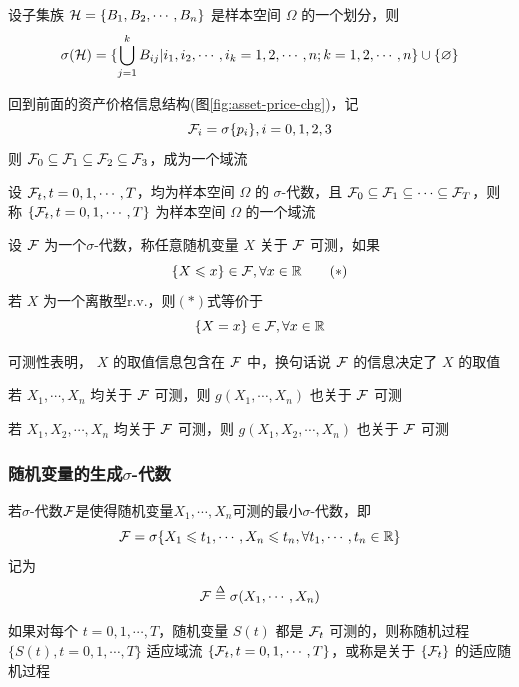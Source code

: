 \begin{example}
    设子集族 $\mathcal{H}=\{B_1,B_2,\cdots,B_n\}$ 是样本空间 $\Omega$ 的一个划分，则
    \[
    \sigma(\mathcal{H})=\{\bigcup_{j=1}^k B_{ij}|i_1,i_2,\cdots,i_k=1,2,\cdots,n;k=1,2,\cdots,n\}\cup \{\varnothing\}
    \]
\end{example}

回到前面的资产价格信息结构(图\ref{fig:asset-price-chg})，记
\[
\mathcal{F}_i=\sigma\{p_i\},i=0,1,2,3
\]
则 $\mathcal{F}_0\subseteq \mathcal{F}_1\subseteq \mathcal{F}_2\subseteq \mathcal{F}_3$，成为一个域流

\begin{definition}[域流]
    设 $\mathcal{F}_t,t=0,1,\cdots,T$，均为样本空间 $\Omega$ 的 $\sigma$-代数，且 $\mathcal{F}_0\subseteq \mathcal{F}_1\subseteq \cdots\subseteq \mathcal{F}_T$，则称 $\{\mathcal{F}_t,t=0,1,\cdots,T\}$ 为样本空间 $\Omega$ 的一个域流
\end{definition}

\begin{definition}[可测性]
    设 $\mathcal{F}$ 为一个$\sigma$-代数，称任意随机变量 $X$ 关于 $\mathcal{F}$ 可测，如果
    \[
    \{X\leqslant x\}\in \mathcal{F},\forall x\in \mathbb{R}\tag{$*$}
    \]
    若 $X$ 为一个离散型r.v.，则$(*)$式等价于
    \[
        \{X= x\}\in \mathcal{F},\forall x\in \mathbb{R}
    \]
\end{definition}

可测性表明， $X$ 的取值信息包含在 $\mathcal{F}$ 中，换句话说 $\mathcal{F}$ 的信息决定了 $X$ 的取值

\begin{property}
若 $X_1,\cdots,X_n$ 均关于 $\mathcal{F}$ 可测，则 $g(X_1,\cdots,X_n)$ 也关于 $\mathcal{F}$ 可测
\end{property}

\begin{property}
    若 $X_1,X_2,\cdots,X_n$ 均关于 $\mathcal{F}$ 可测，则 $g(X_1,X_2,\cdots,X_n)$ 也关于 $\mathcal{F}$ 可测
\end{property}

\subsubsection{随机变量的生成$\sigma$-代数}

若$\sigma$-代数$\mathcal{F}$是使得随机变量$X_1,\cdots,X_n$可测的最小$\sigma$-代数，即
\[
\mathcal{F}=\sigma\{X_1\leqslant t_1,\cdots ,X_n\leqslant t_n,\forall t_1,\cdots,t_n\in \mathbb{R}\}
\]
记为
\[
\mathcal{F}\overset{\Delta}{=}\sigma(X_1,\cdots,X_n)
\]

\begin{definition}[适应域流]
    如果对每个 $t=0,1,\cdots,T$，随机变量 $S(t)$ 都是 $\mathcal{F}_t$ 可测的，则称随机过程 $\{S(t),t=0,1,\cdots,T\}$ 适应域流 $\{\mathcal{F}_t,t=0,1,\cdots,T\}$，或称是关于 $\{\mathcal{F}_t\}$ 的适应随机过程
\end{definition}

